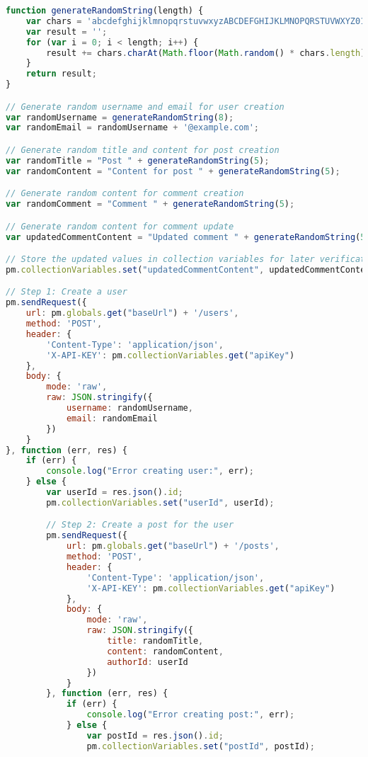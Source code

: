 \begin{lstlisting}[language=JavaScript, caption={Pre-Request Skript für die Erstellung eines Benutzers, Posts und Kommentars}, label={lst:pre-request-script-200}]
function generateRandomString(length) {
    var chars = 'abcdefghijklmnopqrstuvwxyzABCDEFGHIJKLMNOPQRSTUVWXYZ0123456789';
    var result = '';
    for (var i = 0; i < length; i++) {
        result += chars.charAt(Math.floor(Math.random() * chars.length));
    }
    return result;
}

// Generate random username and email for user creation
var randomUsername = generateRandomString(8);
var randomEmail = randomUsername + '@example.com';

// Generate random title and content for post creation
var randomTitle = "Post " + generateRandomString(5);
var randomContent = "Content for post " + generateRandomString(5);

// Generate random content for comment creation
var randomComment = "Comment " + generateRandomString(5);

// Generate random content for comment update
var updatedCommentContent = "Updated comment " + generateRandomString(5);

// Store the updated values in collection variables for later verification
pm.collectionVariables.set("updatedCommentContent", updatedCommentContent);

// Step 1: Create a user
pm.sendRequest({
    url: pm.globals.get("baseUrl") + '/users',
    method: 'POST',
    header: {
        'Content-Type': 'application/json',
        'X-API-KEY': pm.collectionVariables.get("apiKey")
    },
    body: {
        mode: 'raw',
        raw: JSON.stringify({
            username: randomUsername,
            email: randomEmail
        })
    }
}, function (err, res) {
    if (err) {
        console.log("Error creating user:", err);
    } else {
        var userId = res.json().id;
        pm.collectionVariables.set("userId", userId);

        // Step 2: Create a post for the user
        pm.sendRequest({
            url: pm.globals.get("baseUrl") + '/posts',
            method: 'POST',
            header: {
                'Content-Type': 'application/json',
                'X-API-KEY': pm.collectionVariables.get("apiKey")
            },
            body: {
                mode: 'raw',
                raw: JSON.stringify({
                    title: randomTitle,
                    content: randomContent,
                    authorId: userId
                })
            }
        }, function (err, res) {
            if (err) {
                console.log("Error creating post:", err);
            } else {
                var postId = res.json().id;
                pm.collectionVariables.set("postId", postId);


\end{lstlisting}

